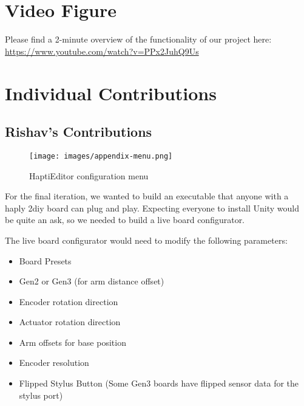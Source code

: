 \appendix

\section{Video Figure}

Please find a 2-minute overview of the functionality of our project here:\\ 
\href{https://www.youtube.com/watch?v=PPx2JuhQ9Us}{https://www.youtube.com/watch?v=PPx2JuhQ9Us}

\section{Individual Contributions}

\subsection{Rishav's Contributions}

\begin{figure}[htp]
    \centering
    \texttt{[image: images/appendix-menu.png]}
    \caption{HaptiEditor configuration menu}
    \label{fig:menu}
\end{figure}

For the final iteration, we wanted to build an executable that anyone with a haply 2diy board can plug and play. Expecting everyone to install Unity would be quite an ask, so we needed to build a live board configurator.

The live board configurator would need to modify the following parameters:
\begin{itemize}
    \item Board Presets
    \item Gen2 or Gen3 (for arm distance offset)
    \item Encoder rotation direction
    \item Actuator rotation direction
    \item Arm offsets for base position
    \item Encoder resolution
    \item Flipped Stylus Button (Some Gen3 boards have flipped sensor data for the stylus port)
\end{itemize}


